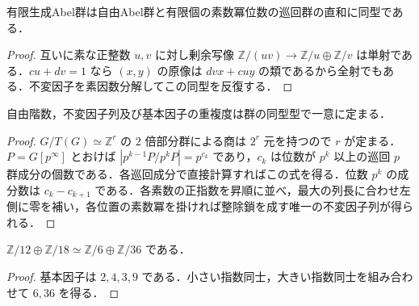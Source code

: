 \begin{prop}[基本因子表示]
有限生成Abel群は自由Abel群と有限個の素数冪位数の巡回群の直和に同型である．
\end{prop}
\begin{proof}
互いに素な正整数 $u,v$ に対し剰余写像 $\mathbb Z/(uv)\to\mathbb Z/u\oplus\mathbb Z/v$ は単射である．$cu+dv=1$ なら $(x,y)$ の原像は $dv x+cu y$ の類であるから全射でもある．不変因子を素因数分解してこの同型を反復する．
\end{proof}
\begin{prop}[不変因子及び基本因子の一意性]
自由階数，不変因子列及び基本因子の重複度は群の同型型で一意に定まる．
\end{prop}
\begin{proof}
$G/T(G)\simeq\mathbb Z^r$ の $2$ 倍部分群による商は $2^r$ 元を持つので $r$ が定まる．$P=G[p^\infty]$ とおけば $|p^{k-1}P/p^kP|=p^{c_k}$ であり，$c_k$ は位数が $p^k$ 以上の巡回 $p$ 群成分の個数である．各巡回成分で直接計算すればこの式を得る．位数 $p^k$ の成分数は $c_k-c_{k+1}$ である．各素数の正指数を昇順に並べ，最大の列長に合わせ左側に零を補い，各位置の素数冪を掛ければ整除鎖を成す唯一の不変因子列が得られる．
\end{proof}
\begin{example}[不変因子の計算]
$\mathbb Z/12\oplus\mathbb Z/18\simeq\mathbb Z/6\oplus\mathbb Z/36$ である．
\end{example}
\begin{proof}
基本因子は $2,4,3,9$ である．小さい指数同士，大きい指数同士を組み合わせて $6,36$ を得る．
\end{proof}
